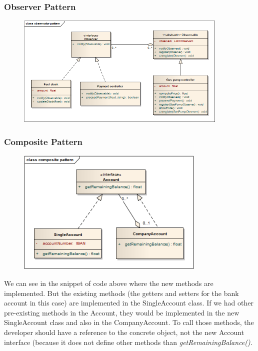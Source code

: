 \subsubsection{Observer Pattern}
\begin{figure}[H]
 \centering
 \includegraphics[width=0.9\textwidth]{../observatorPattern.png}
\end{figure}




\subsubsection{Composite Pattern}
\begin{figure}[H]
 \centering
 \includegraphics[width=0.8\textwidth]{../compositePattern.png}
\end{figure}



We can see in the snippet of code above where the new methods are implemented.
But the existing methods (the getters and setters for the bank account in this case) are implemented in the SingleAccount class. If we had other pre-existing methods in the Account, they would be implemented in the new SingleAccount class and also in the CompanyAccount. To call those methods, the developer should have a reference to the concrete object, not the new Account interface (because it does not define other methods than \textit{getRemainingBalance()}.